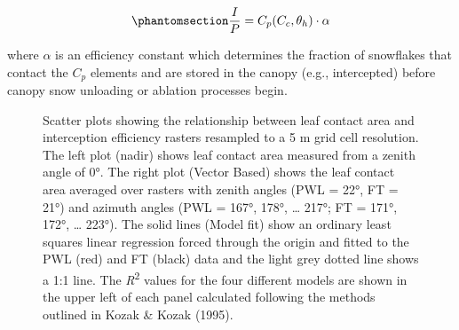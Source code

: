 \documentclass[
  letterpaper,
  DIV=11,
  numbers=noendperiod]{scrartcl}
\begin{document}
\begin{equation}\phantomsection\label{eq-lca-ip}{
  \frac{I}{P} = C_p(C_c, \theta_h) \cdot \alpha
}\end{equation}

where \(\alpha\) is an efficiency constant which determines the fraction
of snowflakes that contact the \(C_p\) elements and are stored in the
canopy (e.g., intercepted) before canopy snow unloading or ablation
processes begin.

\begin{figure}[H]


\caption{\label{fig-lca-vs-ip}Scatter plots showing the relationship
between leaf contact area and interception efficiency rasters resampled
to a 5 m grid cell resolution. The left plot (nadir) shows leaf contact
area measured from a zenith angle of 0°. The right plot (Vector Based)
shows the leaf contact area averaged over rasters with zenith angles
(PWL = 22°, FT = 21°) and azimuth angles (PWL = 167°, 178°, \ldots{}
217°; FT = 171°, 172°, \ldots{} 223°). The solid lines (Model fit) show
an ordinary least squares linear regression forced through the origin
and fitted to the PWL (red) and FT (black) data and the light grey
dotted line shows a 1:1 line. The \emph{R}\textsuperscript{2} values for
the four different models are shown in the upper left of each panel
calculated following the methods outlined in Kozak \& Kozak (1995).}

\end{figure}%
\end{document}

